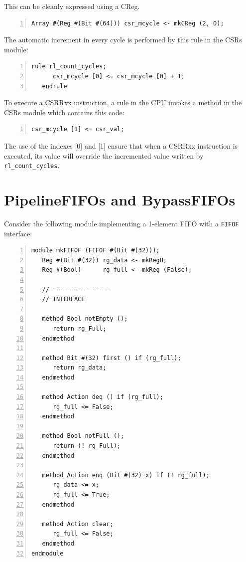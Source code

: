 This can be cleanly expressed using a CReg.

{\small
\begin{Verbatim}[frame=single, numbers=left, label=from src\_Common/CSRs.bsv]
   Array #(Reg #(Bit #(64))) csr_mcycle <- mkCReg (2, 0);
\end{Verbatim}
}

The automatic increment in every cycle is performed by this rule in
the CSRs module:
{\small
\begin{Verbatim}[frame=single, numbers=left, label=from src\_Common/CSRs.bsv]
   rule rl_count_cycles;
      csr_mcycle [0] <= csr_mcycle [0] + 1;
   endrule
\end{Verbatim}
}

To execute a CSRRxx instruction, a rule in the CPU invokes a method in
the CSRs module which contains this code:

{\small
\begin{Verbatim}[frame=single, numbers=left, label=from src\_Common/CSRs.bsv]
   csr_mcycle [1] <= csr_val;
\end{Verbatim}
}

The use of the indexes [0] and [1] ensure that when a CSRRxx
instruction is executed, its value will override the incremented value
written by \verb|rl_count_cycles|.


\section{PipelineFIFOs and BypassFIFOs}

\label{Sec_SpecialFIFOs}

Consider the following module implementing a 1-element FIFO with a
\verb|FIFOF| interface:

{\small
\begin{Verbatim}[frame=single, numbers=left]
module mkFIFOF (FIFOF #(Bit #(32)));
   Reg #(Bit #(32)) rg_data <- mkRegU;
   Reg #(Bool)      rg_full <- mkReg (False);

   // ----------------
   // INTERFACE

   method Bool notEmpty ();
      return rg_Full;
   endmethod

   method Bit #(32) first () if (rg_full);
      return rg_data;
   endmethod

   method Action deq () if (rg_full);
      rg_full <= False;
   endmethod

   method Bool notFull ();
      return (! rg_Full);
   endmethod

   method Action enq (Bit #(32) x) if (! rg_full);
      rg_data <= x;
      rg_full <= True;
   endmethod

   method Action clear;
      rg_full <= False;
   endmethod
endmodule
\end{Verbatim}
}

